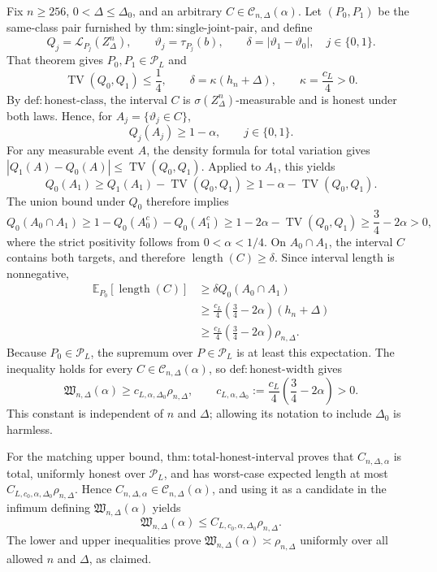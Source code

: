 Fix \(n\geq256\), \(0<\Delta\leq\Delta_0\), and an arbitrary \(C\in\mathcal C_{n,\Delta}(\alpha)\).  Let \((P_0,P_1)\) be the same-class pair furnished by \(\mathrm{thm:single\text{-}joint\text{-}pair}\), and define
\[
 Q_j=\mathcal L_{P_j}(Z_\Delta^n),
 \qquad
 \vartheta_j=\tau_{P_j}(b),
 \qquad
 \delta=|\vartheta_1-\vartheta_0|,
 \quad j\in\{0,1\}.
\]
That theorem gives \(P_0,P_1\in\mathcal P_L\) and
\[
 \operatorname{TV}(Q_0,Q_1)\leq\frac14,
 \qquad
 \delta=\kappa(h_n+\Delta),
 \qquad
 \kappa=\frac{c_L}{4}>0.
\]
By \(\mathrm{def:honest\text{-}class}\), the interval \(C\) is \(\sigma(Z_\Delta^n)\)-measurable and is honest under both laws.  Hence, for \(A_j=\{\vartheta_j\in C\}\),
\[
 Q_j(A_j)\geq1-\alpha,
 \qquad j\in\{0,1\}.
\]
For any measurable event \(A\), the density formula for total variation gives \(|Q_1(A)-Q_0(A)|\leq\operatorname{TV}(Q_0,Q_1)\).  Applied to \(A_1\), this yields
\[
 Q_0(A_1)\geq Q_1(A_1)-\operatorname{TV}(Q_0,Q_1)
 \geq1-\alpha-\operatorname{TV}(Q_0,Q_1).
\]
The union bound under \(Q_0\) therefore implies
\[
 Q_0(A_0\cap A_1)
 \geq1-Q_0(A_0^c)-Q_0(A_1^c)
 \geq1-2\alpha-\operatorname{TV}(Q_0,Q_1)
 \geq\frac34-2\alpha>0,
\]
where the strict positivity follows from \(0<\alpha<1/4\).  On \(A_0\cap A_1\), the interval \(C\) contains both targets, and therefore \(\operatorname{length}(C)\geq\delta\).  Since interval length is nonnegative,
\[
 \begin{aligned}
 \mathbb E_{P_0}[\operatorname{length}(C)]
 &\geq\delta Q_0(A_0\cap A_1)\\
 &\geq\frac{c_L}{4}\left(\frac34-2\alpha\right)(h_n+\Delta)\\
 &\geq\frac{c_L}{4}\left(\frac34-2\alpha\right)\rho_{n,\Delta}.
 \end{aligned}
\]
Because \(P_0\in\mathcal P_L\), the supremum over \(P\in\mathcal P_L\) is at least this expectation.  The inequality holds for every \(C\in\mathcal C_{n,\Delta}(\alpha)\), so \(\mathrm{def:honest\text{-}width}\) gives
\[
 \mathfrak W_{n,\Delta}(\alpha)
 \geq c_{L,\alpha,\Delta_0}\rho_{n,\Delta},
 \qquad
 c_{L,\alpha,\Delta_0}:=\frac{c_L}{4}\left(\frac34-2\alpha\right)>0.
\]
This constant is independent of \(n\) and \(\Delta\); allowing its notation to include \(\Delta_0\) is harmless.

For the matching upper bound, \(\mathrm{thm:total\text{-}honest\text{-}interval}\) proves that \(C_{n,\Delta,\alpha}\) is total, uniformly honest over \(\mathcal P_L\), and has worst-case expected length at most \(C_{L,c_0,\alpha,\Delta_0}\rho_{n,\Delta}\).  Hence \(C_{n,\Delta,\alpha}\in\mathcal C_{n,\Delta}(\alpha)\), and using it as a candidate in the infimum defining \(\mathfrak W_{n,\Delta}(\alpha)\) yields
\[
 \mathfrak W_{n,\Delta}(\alpha)
 \leq C_{L,c_0,\alpha,\Delta_0}\rho_{n,\Delta}.
\]
The lower and upper inequalities prove \(\mathfrak W_{n,\Delta}(\alpha)\asymp\rho_{n,\Delta}\) uniformly over all allowed \(n\) and \(\Delta\), as claimed.